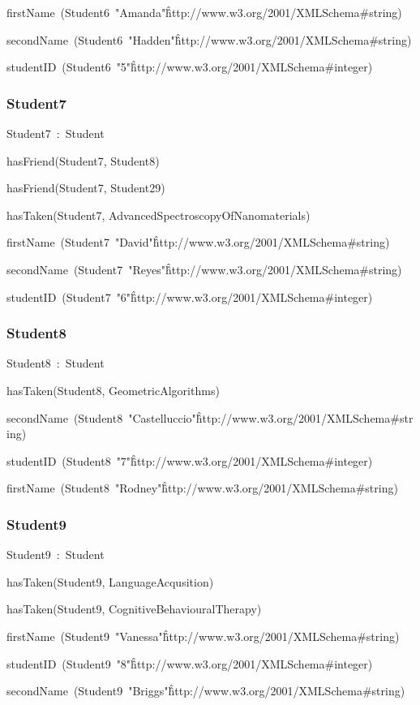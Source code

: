 \documentclass{article}
\begin{document}
firstName~(Student6~"Amanda"\^\^http://www.w3.org/2001/XMLSchema#string)

secondName~(Student6~"Hadden"\^\^http://www.w3.org/2001/XMLSchema#string)

studentID~(Student6~"5"\^\^http://www.w3.org/2001/XMLSchema#integer)

\subsubsection*{Student7}

Student7~:~Student

hasFriend(Student7, Student8)

hasFriend(Student7, Student29)

hasTaken(Student7, AdvancedSpectroscopyOfNanomaterials)

firstName~(Student7~"David"\^\^http://www.w3.org/2001/XMLSchema#string)

secondName~(Student7~"Reyes"\^\^http://www.w3.org/2001/XMLSchema#string)

studentID~(Student7~"6"\^\^http://www.w3.org/2001/XMLSchema#integer)

\subsubsection*{Student8}

Student8~:~Student

hasTaken(Student8, GeometricAlgorithms)

secondName~(Student8~"Castelluccio"\^\^http://www.w3.org/2001/XMLSchema#string)

studentID~(Student8~"7"\^\^http://www.w3.org/2001/XMLSchema#integer)

firstName~(Student8~"Rodney"\^\^http://www.w3.org/2001/XMLSchema#string)

\subsubsection*{Student9}

Student9~:~Student

hasTaken(Student9, LanguageAcqusition)

hasTaken(Student9, CognitiveBehaviouralTherapy)

firstName~(Student9~"Vanessa"\^\^http://www.w3.org/2001/XMLSchema#string)

studentID~(Student9~"8"\^\^http://www.w3.org/2001/XMLSchema#integer)

secondName~(Student9~"Briggs"\^\^http://www.w3.org/2001/XMLSchema#string)
\end{document}
